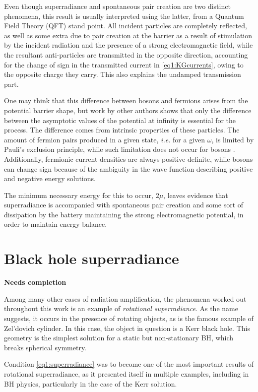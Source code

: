 Even though superradiance and spontaneous pair creation are two distinct phenomena, this result is usually interpreted using the latter, from a Quantum Field Theory (QFT) stand point. 
All incident particles are completely reflected, as well as some extra due to pair creation at the barrier as a result of stimulation by the incident radiation and the presence of a strong electromagnetic field, while the resultant anti-particles are transmitted in the opposite direction, accounting for the change of sign in the transmitted current in \eqref{eq1:KGcurrents}, owing to the opposite charge they carry. 
This also explains the undamped transmission part.

One may think that this difference between bosons and fermions arises from the potential barrier shape, but work by other authors \cite{Sauter1931,Manogue1988,Winter1959} shows that only the difference between the asymptotic values of the potential at infinity is essential for the process. 
The difference comes from intrinsic properties of these particles. 
The amount of fermion pairs produced in a given state, \emph{i.e.} for a given $\omega$, is limited by Pauli's exclusion principle, while such limitation does not occur for bosons \cite{Brito2015}. 
Additionally, fermionic current densities are always positive definite, while bosons can change sign because of the ambiguity in the wave function describing positive and negative energy solutions. 

The minimum necessary energy for this to occur, $2\mu$, leaves evidence that superradiance is accompanied with spontaneous pair creation and some sort of dissipation by the battery maintaining the strong electromagnetic potential, in order to maintain energy balance.   



\section{Black hole superradiance}

\textbf{Needs completion}

Among many other cases of radiation amplification, the phenomena worked out throughout this work is an example of \emph{rotational superradiance}. 
As the name suggests, it occurs in the presence of rotating objects, as is the famous example of Zel'dovich cylinder. In this case, the object in question is a Kerr black hole. 
This geometry is the simplest solution for a static but non-stationary BH, which breaks spherical symmetry.

Condition \eqref{eq1:superradiance} was to become one of the most important results of rotational superradiance, as it presented itself in multiple examples, including in BH physics, particularly in the case of the Kerr solution.




\cleardoublepage
